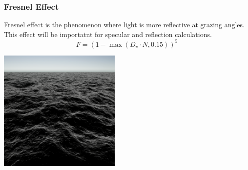 \subsubsection{Fresnel Effect}
Fresnel effect is the phenomenon where light is more reflective at grazing angles. This effect will be importatnt for specular and reflection calculations.
\begin{equation}
    F = (1 - \max(D_v \cdot N, 0.15))^{5}
\end{equation}
\begin{minipage}{1\textwidth}
    \centering
    \includegraphics[width=0.45\textwidth]{"images/fresnel.png"}
    \label{fig:fresnel_effect}
\end{minipage}


